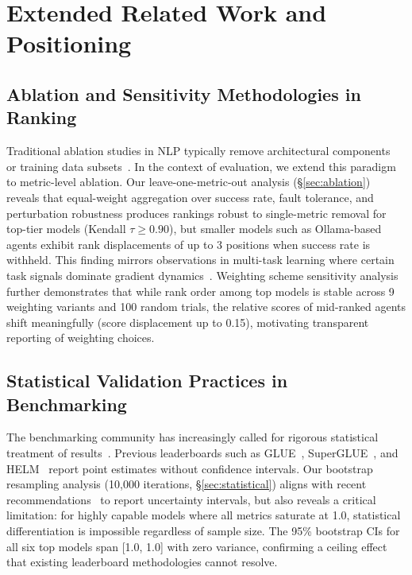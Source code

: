 \section{Extended Related Work and Positioning}

\subsection{Ablation and Sensitivity Methodologies in Ranking}

Traditional ablation studies in NLP typically remove architectural components~\cite{michel2019eighteen} or training data subsets~\cite{radford2019language}. In the context of evaluation, we extend this paradigm to metric-level ablation. Our leave-one-metric-out analysis (\S\ref{sec:ablation}) reveals that equal-weight aggregation over success rate, fault tolerance, and perturbation robustness produces rankings robust to single-metric removal for top-tier models (Kendall $\tau \geq 0.90$), but smaller models such as Ollama-based agents exhibit rank displacements of up to 3 positions when success rate is withheld. This finding mirrors observations in multi-task learning where certain task signals dominate gradient dynamics~\cite{chen2018gradnorm}. Weighting scheme sensitivity analysis further demonstrates that while rank order among top models is stable across 9 weighting variants and 100 random trials, the relative scores of mid-ranked agents shift meaningfully (score displacement up to 0.15), motivating transparent reporting of weighting choices.

\subsection{Statistical Validation Practices in Benchmarking}

The benchmarking community has increasingly called for rigorous statistical treatment of results~\cite{deoghare2024statistical}. Previous leaderboards such as GLUE~\cite{wang2018glue}, SuperGLUE~\cite{wang2019superglue}, and HELM~\cite{liang2022holistic} report point estimates without confidence intervals. Our bootstrap resampling analysis (10,000 iterations, \S\ref{sec:statistical}) aligns with recent recommendations~\cite{ulmer2024statistical} to report uncertainty intervals, but also reveals a critical limitation: for highly capable models where all metrics saturate at 1.0, statistical differentiation is impossible regardless of sample size. The 95\% bootstrap CIs for all six top models span [1.0, 1.0] with zero variance, confirming a ceiling effect that existing leaderboard methodologies cannot resolve.

